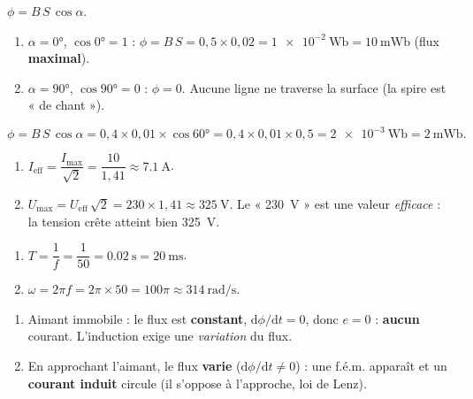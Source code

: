 \documentclass[11pt,a4paper]{article}
\begin{document}
\begin{corrige}
$\phi=B\,S\,\cos\alpha$.
\begin{enumerate}[label=\alph*)]
  \item $\alpha=\ang{0}$, $\cos\ang{0}=1$ : $\phi=B\,S=0{,}5\times0{,}02=\qty{1e-2}{\weber}=\qty{10}{\milli\weber}$
        (flux \textbf{maximal}).
  \item $\alpha=\ang{90}$, $\cos\ang{90}=0$ : $\phi=0$. Aucune ligne ne traverse la surface (la spire
        est « de chant »).
\end{enumerate}
\end{corrige}

\begin{corrige}
\[ \phi=B\,S\,\cos\alpha=0{,}4\times0{,}01\times\cos\ang{60}=0{,}4\times0{,}01\times0{,}5=\qty{2e-3}{\weber}=\qty{2}{\milli\weber}. \]
\end{corrige}

\begin{corrige}
\begin{enumerate}[label=\alph*)]
  \item $I_{\text{eff}}=\dfrac{I_{\max}}{\sqrt2}=\dfrac{10}{1{,}41}\approx\qty{7.1}{\ampere}$.
  \item $U_{\max}=U_{\text{eff}}\,\sqrt2=230\times1{,}41\approx\qty{325}{\volt}$. Le « \qty{230}{\volt} »
        est une valeur \emph{efficace} : la tension crête atteint bien \qty{325}{\volt}.
\end{enumerate}
\end{corrige}

\begin{corrige}
\begin{enumerate}[label=\alph*)]
  \item $T=\dfrac1f=\dfrac{1}{50}=\qty{0.02}{\second}=\qty{20}{\milli\second}$.
  \item $\omega=2\pi f=2\pi\times50=100\pi\approx\qty{314}{\radian\per\second}$.
\end{enumerate}
\end{corrige}

\begin{corrige}
\begin{enumerate}[label=\alph*)]
  \item Aimant immobile : le flux est \textbf{constant}, $\mathrm{d}\phi/\mathrm{d} t=0$, donc $e=0$ : \textbf{aucun}
        courant. L'induction exige une \emph{variation} du flux.
  \item En approchant l'aimant, le flux \textbf{varie} ($\mathrm{d}\phi/\mathrm{d} t\neq0$) : une f.é.m. apparaît et
        un \textbf{courant induit} circule (il s'oppose à l'approche, loi de Lenz).
\end{enumerate}
\end{corrige}
\end{document}
